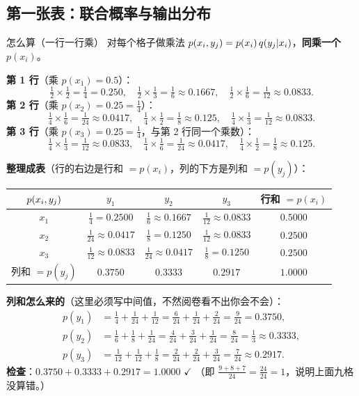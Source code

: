 \documentclass[11pt,a4paper]{ctexart}
\begin{document}
\subsection{第一张表：联合概率与输出分布}

\begin{calc}{怎么算（一行一行乘）}
对每个格子做乘法 $p\!\left(x_i,y_j\right)=p(x_i)\,q(y_j|x_i)$，\textbf{同乘一个 $p(x_i)$}。

\textbf{第 1 行}（乘 $p(x_1)=0.5$）：
\[
\tfrac12\!\times\!\tfrac12=\tfrac14=0.250,\quad
\tfrac12\!\times\!\tfrac13=\tfrac16\approx0.1667,\quad
\tfrac12\!\times\!\tfrac16=\tfrac1{12}\approx0.0833 .
\]
\textbf{第 2 行}（乘 $p(x_2)=0.25=\frac14$）：
\[
\tfrac14\!\times\!\tfrac16=\tfrac1{24}\approx0.0417,\quad
\tfrac14\!\times\!\tfrac12=\tfrac18\approx0.125,\quad
\tfrac14\!\times\!\tfrac13=\tfrac1{12}\approx0.0833 .
\]
\textbf{第 3 行}（乘 $p(x_3)=0.25=\frac14$，与第 2 行同一个乘数）：
\[
\tfrac14\!\times\!\tfrac13=\tfrac1{12}\approx0.0833,\quad
\tfrac14\!\times\!\tfrac16=\tfrac1{24}\approx0.0417,\quad
\tfrac14\!\times\!\tfrac12=\tfrac18\approx0.125 .
\]
\end{calc}

\textbf{整理成表}（行的右边是行和 $=p(x_i)$，列的下方是列和 $=p(y_j)$）：

\begin{center}\small
\setlength{\tabcolsep}{6pt}
\begin{tabular}{@{}c|c|c|c|c@{}}
\toprule
$p\!\left(x_i,y_j\right)$ & $y_1$ & $y_2$ & $y_3$ & 行和 $=p(x_i)$\\
\midrule
$x_1$ & $\tfrac14=0.2500$ & $\tfrac16\approx0.1667$ & $\tfrac1{12}\approx0.0833$ & $0.5000$\\
$x_2$ & $\tfrac1{24}\approx0.0417$ & $\tfrac18=0.1250$ & $\tfrac1{12}\approx0.0833$ & $0.2500$\\
$x_3$ & $\tfrac1{12}\approx0.0833$ & $\tfrac1{24}\approx0.0417$ & $\tfrac18=0.1250$ & $0.2500$\\
\midrule
列和 $=p(y_j)$ & $0.3750$ & $0.3333$ & $0.2917$ & $1.0000$\\
\bottomrule
\end{tabular}
\end{center}

\textbf{列和怎么来的}（这里必须写中间值，不然阅卷看不出你会不会）：
\begin{align*}
p(y_1)&=\tfrac14+\tfrac1{24}+\tfrac1{12}=\tfrac{6}{24}+\tfrac{1}{24}+\tfrac{2}{24}=\tfrac{9}{24}=0.3750,\\
p(y_2)&=\tfrac16+\tfrac18+\tfrac1{24}=\tfrac{4}{24}+\tfrac{3}{24}+\tfrac{1}{24}=\tfrac{8}{24}=\tfrac13\approx0.3333,\\
p(y_3)&=\tfrac1{12}+\tfrac1{12}+\tfrac18=\tfrac{2}{24}+\tfrac{2}{24}+\tfrac{3}{24}=\tfrac{7}{24}\approx0.2917 .
\end{align*}
\textbf{检查}：$0.3750+0.3333+0.2917=1.0000$ $\checkmark$
（即 $\frac{9+8+7}{24}=\frac{24}{24}=1$，说明上面九格没算错。）
\end{document}
